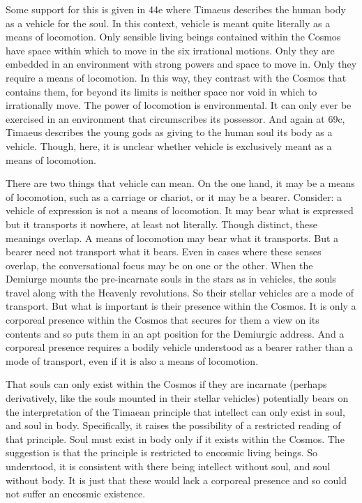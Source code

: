 Some support for this is given in 44e where Timaeus describes the human body as a vehicle for the soul. In this context, vehicle is meant quite literally as a means of locomotion. Only sensible living beings contained within the Cosmos have space within which to move in the six irrational motions. Only they are embedded in an environment with strong powers and space to move in. Only they require a means of locomotion. In this way, they contrast with the Cosmos that contains them, for beyond its limits is neither space nor void in which to irrationally move. The power of locomotion is environmental. It can only ever be exercised in an environment that circumscribes its possessor. And again at 69c, Timaeus describes the young gods as giving to the human soul its body as a vehicle. Though, here, it is unclear whether vehicle is exclusively meant as a means of locomotion.

There are two things that vehicle can mean. On the one hand, it may be a means of locomotion, such as a carriage or chariot, or it may be a bearer. Consider: a vehicle of expression is not a means of locomotion. It may bear what is expressed but it transports it nowhere, at least not literally. Though distinct, these meanings overlap. A means of locomotion may bear what it transports. But a bearer need not transport what it bears. Even in cases where these senses overlap, the conversational focus may be on one or the other. When the Demiurge mounts the pre-incarnate souls in the stars as in vehicles, the souls travel along with the Heavenly revolutions. So their stellar vehicles are a mode of transport. But what is important is their presence within the Cosmos. It is only a corporeal presence within the Cosmos that secures for them a view on its contents and so puts them in an apt position for the Demiurgic address. And a corporeal presence requires a bodily vehicle understood as a bearer rather than a mode of transport, even if it is also a means of locomotion.

That souls can only exist within the Cosmos if they are incarnate (perhaps derivatively, like the souls mounted in their stellar vehicles) potentially bears on the interpretation of the Timaean principle that intellect can only exist in soul, and soul in body. Specifically, it raises the possibility of a restricted reading of that principle. Soul must exist in body only if it exists within the Cosmos. The suggestion is that the principle is restricted to encosmic living beings. So understood, it is consistent with there being intellect without soul, and soul without body. It is just that these would lack a corporeal presence and so could not suffer an encosmic existence. 

